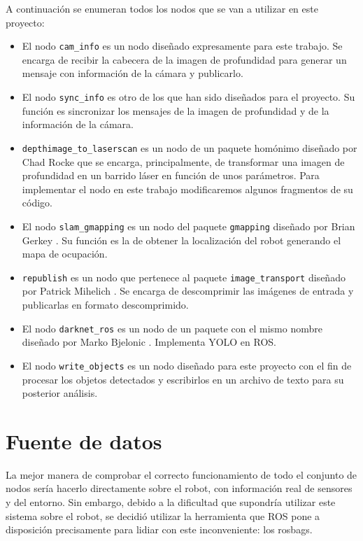 A continuación se enumeran todos los nodos que se van a utilizar en este proyecto:

\begin{itemize}

	\item El nodo \texttt{cam\_info} es un nodo diseñado expresamente para este trabajo. Se encarga de recibir la cabecera de la imagen de profundidad para generar un mensaje con información de la cámara y publicarlo.
	\item El nodo \texttt{sync\_info} es otro de los que han sido diseñados para el proyecto. Su función es sincronizar los mensajes de la imagen de profundidad y de la información de la cámara.
	\item \texttt{depthimage\_to\_laserscan} es un nodo de un paquete homónimo diseñado por Chad Rocke \cite{di2ls} que se encarga, principalmente, de transformar una imagen de profundidad en un barrido láser en función de unos parámetros. Para implementar el nodo en este trabajo modificaremos algunos fragmentos de su código.
	\item El nodo \texttt{slam\_gmapping} es un nodo del paquete \texttt{gmapping} diseñado por Brian Gerkey \cite{gmapping}. Su función es la de obtener la localización del robot generando el mapa de ocupación.
	\item \texttt{republish} es un nodo que pertenece al paquete \texttt{image\_transport} diseñado por Patrick Mihelich \cite{republish}. Se encarga de descomprimir las imágenes de entrada y publicarlas en formato descomprimido.
	\item El nodo \texttt{darknet\_ros} es un nodo de un paquete con el mismo nombre diseñado por Marko Bjelonic \cite{darknet}. Implementa YOLO en ROS.
	\item El nodo \texttt{write\_objects} es un nodo diseñado para este proyecto con el fin de procesar los objetos detectados y escribirlos en un archivo de texto para su posterior análisis.
	

\end{itemize}


\section{Fuente de datos} \label{sec:datos}

La mejor manera de comprobar el correcto funcionamiento de todo el conjunto de nodos sería hacerlo directamente sobre el robot, con información real de sensores y del entorno. Sin embargo, debido a la dificultad que supondría utilizar este sistema sobre el robot, se decidió utilizar la herramienta que ROS pone a disposición precisamente para lidiar con este inconveniente: los rosbags.\\

